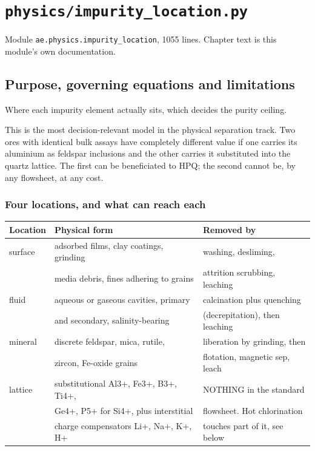 \documentclass[10pt,a4paper,twoside]{report}
\begin{document}
\clearpage

\chapter{\texttt{physics/impurity\_location.py}}\label{ch:impurity_location}


{\footnotesize\color{slate}Module \texttt{ae.physics.impurity\_location}, 1055 lines. Chapter text is this module's own documentation.\par}

\section{Purpose, governing equations and limitations}

Where each impurity element actually sits, which decides the purity ceiling.

This is the most decision-relevant model in the physical separation track. Two ores with identical bulk assays have completely different value if one carries its aluminium as feldspar inclusions and the other carries it substituted into the quartz lattice. The first can be beneficiated to HPQ; the second cannot be, by any flowsheet, at any cost.

\subsection*{Four locations, and what can reach each}

\begin{center}
\footnotesize
\begin{tabular}{@{}llp{}@{}}
\toprule
Location & Physical form & Removed by \\
\midrule
surface & adsorbed films, clay coatings, grinding & washing, desliming, \\
 & media debris, fines adhering to grains & attrition scrubbing, leaching \\
fluid & aqueous or gaseous cavities, primary & calcination plus quenching \\
 & and secondary, salinity-bearing & (decrepitation), then leaching \\
mineral & discrete feldspar, mica, rutile, & liberation by grinding, then \\
 & zircon, Fe-oxide grains & flotation, magnetic sep, leach \\
lattice & substitutional Al3+, Fe3+, B3+, Ti4+, & NOTHING in the standard \\
 & Ge4+, P5+ for Si4+, plus interstitial & flowsheet. Hot chlorination \\
 & charge compensators Li+, Na+, K+, H+ & touches part of it, see below \\
\bottomrule
\end{tabular}
\end{center}
\end{document}
